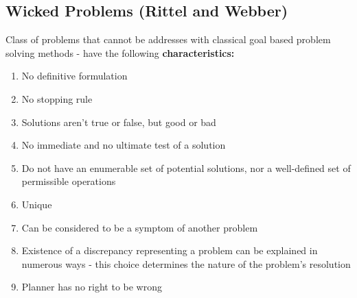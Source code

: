 \documentclass{article}
\begin{document}
\subsection{Wicked Problems (Rittel and Webber)}
Class of problems that cannot be addresses with classical goal based problem solving methods - have the following \textbf{characteristics:}
\begin{enumerate}
    \item No definitive formulation
    \item No stopping rule
    \item Solutions aren't true or false, but good or bad
    \item No immediate and no ultimate test of a solution
    \item Do not have an enumerable set of potential solutions, nor a well-defined set of permissible operations
    \item Unique
    \item Can be considered to be a symptom of another problem
    \item Existence of a discrepancy representing a problem can be explained in numerous ways - this choice determines the nature of the problem's resolution
    \item Planner has no right to be wrong
\end{enumerate}
\end{document}
